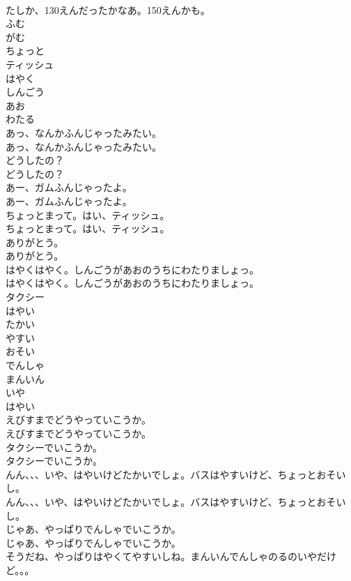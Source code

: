 \documentclass[8pt]{extreport}
\begin{document}
\begin{CJK}{UTF8}{min}
\\	たしか、130えんだったかなあ。150えんかも。 
\\	ふむ
\\	がむ
\\	ちょっと
\\	ティッシュ
\\	はやく
\\	しんごう
\\	あお
\\	わたる
\\	あっ、なんかふんじゃったみたい。	
\\	あっ、なんかふんじゃったみたい。 
\\	どうしたの？	
\\	どうしたの？ 
\\	あー、ガムふんじゃったよ。	
\\	あー、ガムふんじゃったよ。 
\\	ちょっとまって。はい、ティッシュ。	
\\	ちょっとまって。はい、ティッシュ。 
\\	ありがとう。	
\\	ありがとう。 
\\	はやくはやく。しんごうがあおのうちにわたりましょっ。	
\\	はやくはやく。しんごうがあおのうちにわたりましょっ。 
\\	タクシー
\\	はやい
\\	たかい
\\	やすい
\\	おそい
\\	でんしゃ
\\	まんいん
\\	いや
\\	はやい
\\	えびすまでどうやっていこうか。	
\\	えびすまでどうやっていこうか。 
\\	タクシーでいこうか。	
\\	タクシーでいこうか。 
\\	んん、、、いや、はやいけどたかいでしょ。バスはやすいけど、ちょっとおそいし。	
\\	んん、、、いや、はやいけどたかいでしょ。バスはやすいけど、ちょっとおそいし。 
\\	じゃあ、やっぱりでんしゃでいこうか。	
\\	じゃあ、やっぱりでんしゃでいこうか。 
\\	そうだね、やっぱりはやくてやすいしね。まんいんでんしゃのるのいやだけど。。。	

\end{CJK}
\end{document}
